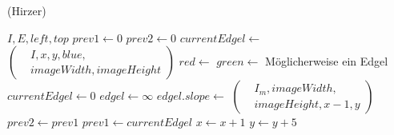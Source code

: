 \begin{algorithm}[!ht]\small
\caption{ (Hirzer)}
\label{alg:findedgelshirzer-1}
	\begin{algorithmic}[1]
		\Require $I, E,\mathit{left},\mathit{top}$
			\State $\mathit{prev1} \gets 0$
			\State $\mathit{prev2} \gets 0$
				\State $\mathit{currentEdgel} \gets$ 
				$\left(
				\begin{aligned}
					& I,x,y,\mathit{blue},\\
					& \mathit{imageWidth},\mathit{imageHeight}
				\end{aligned}\right)$
				\label{alg:findedgelshirzer-1-color-start}
				\State $\mathit{red} \gets$ 
				\State $\mathit{green} \gets$ 
				\label{alg:findedgelshirzer-1-color-end}
					\State Möglicherweise ein Edgel
				\Else
					\State $\mathit{currentEdgel} \gets 0$
				\EndIf
					\State $\mathit{edgel} \gets \infty$
					\State {}
					\State $\mathit{edgel.slope} \gets$ 
					$\left(
					\begin{aligned}
						& I_m, \mathit{imageWidth},\\
						& \mathit{imageHeight}, x - 1,y
					\end{aligned}\right)$
					\State {}
				\EndIf
				\State $\mathit{prev2} \gets \mathit{prev1}$
				\State $\mathit{prev1} \gets \mathit{currentEdgel}$
				\State $x \gets x + 1$
			\EndFor
			\State $y \gets y + 5$
		\EndFor
	\end{algorithmic}
\end{algorithm}
